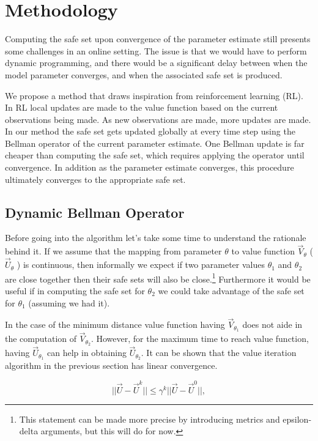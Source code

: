 \documentclass{journal}
\begin{document}
\section{Methodology}
Computing the safe set upon convergence of the parameter estimate still presents some challenges in an online setting. The issue is that we would have to perform dynamic programming, and there would be a significant delay between when the model parameter converges, and when the associated safe set is produced. 

We propose a method that draws inspiration from reinforcement learning (RL). In RL local updates are made to the value function based on the current observations being made. As new observations are made, more updates are made. In our method the safe set gets updated globally at every time step using the Bellman operator of the current parameter estimate. One Bellman update is far cheaper than computing the safe set, which requires applying the operator until convergence. In addition as the parameter estimate converges, this procedure ultimately converges to the appropriate safe set.   

\subsection{Dynamic Bellman Operator}

Before going into the algorithm let's take some time to understand the rationale behind it. If we assume that the mapping from parameter $\theta$ to value function $\vec{V}_{\theta}$ ($\vec{U}_{\theta}$ ) is continuous, then informally we expect if two parameter values $\theta_1$ and $\theta_2$ are close together then their safe sets will also be close.\footnote{This statement can be made more precise by introducing metrics and epsilon-delta arguments, but this will do for now.} Furthermore it would be useful if in computing the safe set for $\theta_2$ we could take advantage of the safe set for $\theta_1$ (assuming we had it).

In the case of the minimum distance value function having $\vec{V}_{\theta_1}$ does not aide in the computation of $\vec{V}_{\theta_2}$. However, for the maximum time to reach value function, having $\vec{U}_{\theta_1}$ can help in obtaining $\vec{U}_{\theta_2}$. It can be shown that the value iteration algorithm in the previous section has linear convergence.

\begin{equation}
||\vec{U}-\vec{U}^k|| \leq \gamma^k ||\vec{U}-\vec{U}^0||,
\end{equation}
\end{document}
